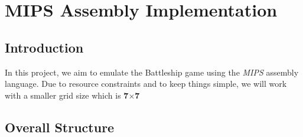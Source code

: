 \section{MIPS Assembly Implementation}
\subsection{Introduction}
\qquad In this project, we aim to emulate the Battleship game using the \textit{MIPS} assembly language. Due to resource constraints and to keep things simple, we will work with a smaller grid size which is \textbf{7$\times$7}

\subsection{Overall Structure}
